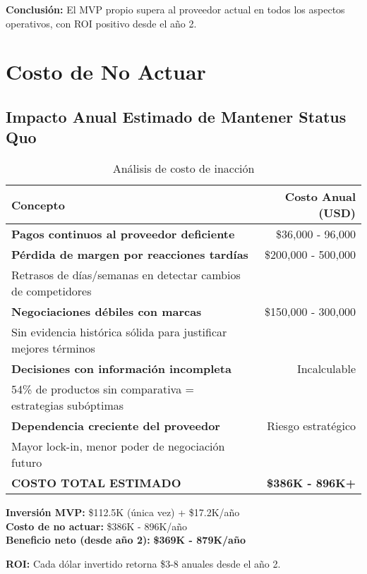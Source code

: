 \documentclass[12pt,a4paper]{article}
\begin{document}
\textbf{Conclusión:} El MVP propio supera al proveedor actual en todos los aspectos operativos, con ROI positivo desde el año 2.

\newpage
\section{Costo de No Actuar}

\subsection{Impacto Anual Estimado de Mantener Status Quo}

\begin{table}[h]
\centering
\begin{tabularx}{\textwidth}{|X|r|}
\hline
\rowcolor{dangerred!20}
\textbf{Concepto} & \textbf{Costo Anual (USD)} \\
\hline
\textbf{Pagos continuos al proveedor deficiente} & \$36,000 - 96,000 \\
\hline
\textbf{Pérdida de margen por reacciones tardías} & \$200,000 - 500,000 \\
\small{Retrasos de días/semanas en detectar cambios de competidores} & \\
\hline
\textbf{Negociaciones débiles con marcas} & \$150,000 - 300,000 \\
\small{Sin evidencia histórica sólida para justificar mejores términos} & \\
\hline
\textbf{Decisiones con información incompleta} & Incalculable \\
\small{54\% de productos sin comparativa = estrategias subóptimas} & \\
\hline
\textbf{Dependencia creciente del proveedor} & Riesgo estratégico \\
\small{Mayor lock-in, menor poder de negociación futuro} & \\
\hline
\rowcolor{dangerred!30}
\textbf{COSTO TOTAL ESTIMADO} & \textbf{\$386K - 896K+} \\
\hline
\end{tabularx}
\caption{Análisis de costo de inacción}
\end{table}

\begin{tcolorbox}[colback=warningyellow!20, colframe=warningyellow, title=\textbf{Análisis de Oportunidad}]
\textbf{Inversión MVP:} \$112.5K (única vez) + \$17.2K/año\\
\textbf{Costo de no actuar:} \$386K - 896K/año\\
\textbf{Beneficio neto (desde año 2):} \textcolor{successgreen}{\textbf{\$369K - 879K/año}}

\vspace{0.3cm}
\textbf{ROI:} Cada dólar invertido retorna \$3-8 anuales desde el año 2.
\end{tcolorbox}
\end{document}
